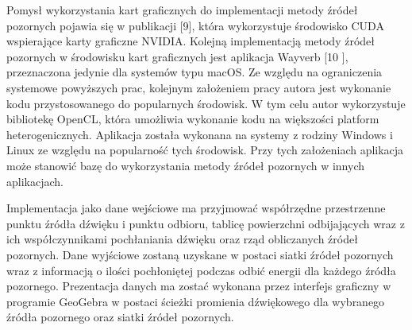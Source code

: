 Pomysł  wykorzystania kart graficznych do implementacji metody źródeł pozornych pojawia się w publikacji [9], która wykorzystuje środowisko CUDA wspierające karty graficzne NVIDIA. Kolejną implementacją metody źródeł pozornych w środowisku kart graficznych jest aplikacja Wayverb [10 ], przeznaczona jedynie dla systemów typu macOS. Ze względu na ograniczenia systemowe powyższych prac, kolejnym założeniem pracy autora jest wykonanie kodu przystosowanego do popularnych środowisk. W tym celu autor wykorzystuje bibliotekę OpenCL, która umożliwia wykonanie kodu na większości platform heterogenicznych. Aplikacja została wykonana na systemy z rodziny Windows i Linux ze względu na popularność tych środowisk. Przy tych założeniach aplikacja może stanowić bazę do wykorzystania metody źródeł pozornych w innych aplikacjach.

Implementacja jako dane wejściowe ma przyjmować współrzędne przestrzenne punktu źródła dźwięku i punktu odbioru, tablicę powierzchni odbijających wraz z ich współczynnikami pochłaniania dźwięku oraz rząd obliczanych źródeł pozornych. Dane wyjściowe zostaną uzyskane w postaci siatki źródeł pozornych wraz z informacją o ilości pochłoniętej podczas odbić energii dla każdego źródła pozornego. Prezentacja danych ma zostać wykonana przez interfejs graficzny w programie GeoGebra w postaci ścieżki promienia dźwiękowego dla wybranego źródła pozornego oraz siatki źródeł pozornych.

















